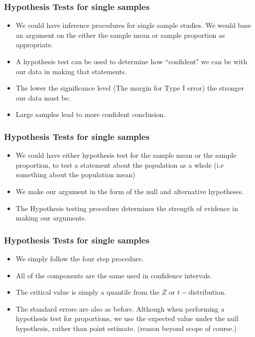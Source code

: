 \documentclass[a4]{beamer}
\begin{document}
\begin{frame}
\frametitle{Hypothesis Tests for single samples}

\begin{itemize}
\item We could have inference procedures for single sample studies. We would base an argument on the either the sample mean or sample proportion as appropriate.
\item A hypothesis test can be used to determine how ``confident" we can be with our data in making that statements.
\item The lower the significance level (The margin for Type I error) the stronger our data must be.
\item Large samples lead to more confident conclusion.
\end{itemize}
\end{frame}
\begin{frame}
\frametitle{Hypothesis Tests for single samples}
\begin{itemize}
\item We could have either hypothesis test for the sample mean or the sample proportion, to test a statement about the population as a whole (i.e something about the population mean)
\item We make our argument in the form of the null and alternative hypotheses. 
\item The Hypothesis testing procedure determines the strength of evidence in making our arguments. 
\end{itemize}
\end{frame}
\begin{frame}
\frametitle{Hypothesis Tests for single samples}
\begin{itemize}
\item We simply follow the four step procedure. 
\item All of the components are the same used in confidence intervals.
\item The critical value is simply a quantile from the $Z$ or $t-$distribution.
\item The standard errors are also as before. Although when performing a hypothesis test for proportions, we use the expected value under the null hypothesis, rather than point estimate. (reason beyond scope of course.)
\end{itemize}
\end{frame}
\end{document}
